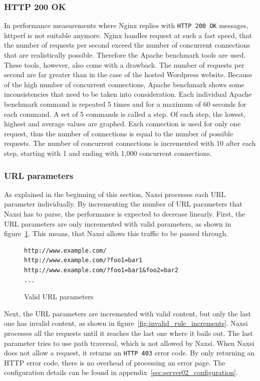 \documentclass[Methods]{subfiles}
\begin{document}
\subsubsection{HTTP 200 OK}
\label{sec:HTTP 200 OK}
In performance measurements where Nginx replies with \verb+HTTP 200 OK+ messages, httperf is not suitable anymore. Nginx handles request at such a fast speed, that the number of requests per second exceed the number of concurrent connections that are realistically possible. Therefore the Apache benchmark tools are used. These tools, however, also come with a drawback. The number of requests per second are far greater than in the case of the hosted Wordpress website. Because of the high number of concurrent connections, Apache benchmark shows some inconsistencies that need to be taken into consideration. Each individual Apache benchmark command is repeated 5 times and for a maximum of 60 seconds for each command. A set of 5 commands is called a step. Of each step, the lowest, highest and average values are graphed. Each connection is used for only one request, thus the number of connections is equal to the number of possible requests. The number of concurrent connections is incremented with 10 after each step, starting with 1 and ending with 1,000 concurrent connections.

\subsubsection{URL parameters}
As explained in the beginning of this section, Naxsi processes each \ac{URL} parameter individually. By incrementing the number of \ac{URL} parameters that Naxsi has to parse, the performance is expected to decrease linearly. First, the \ac{URL} parameters are only incremented with valid parameters, as shown in figure~\ref{fig:valid_rule_increments}. This means, that Naxsi allows this traffic to be passed through. 

\begin{figure}[H]
\caption{Valid URL parameters}
\begin{verbatim}
http://www.example.com/
http://www.example.com/?foo1=bar1
http://www.example.com/?foo1=bar1&foo2=bar2
...
\end{verbatim}
\label{fig:valid_rule_increments}
\end{figure}

Next, the \ac{URL} parameters are incremented with valid content, but only the last one has invalid content, as shown in figure~\ref{fig:invalid_rule_increments}. Naxsi processes all the requests until it reaches the last one where it bails out. The last parameter tries to use path traversal, which is not allowed by Naxsi. When Naxsi does not allow a request, it returns an \verb+HTTP 403+ error code. By only returning an HTTP error code, there is no overhead of processing an error page. The configuration details can be found in appendix~\ref{sec:server02_configuration}.
\end{document}

